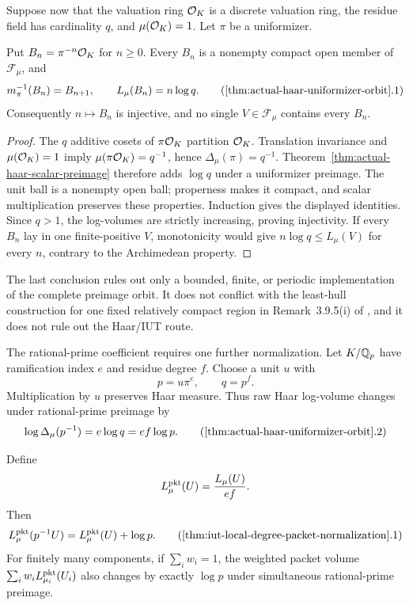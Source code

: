 Suppose now that the valuation ring $\mathcal O_K$ is a discrete valuation ring,
the residue field has cardinality $q$, and $\mu(\mathcal O_K)=1$.  Let $\pi$ be a
uniformizer.

\begin{theorem}
\label{thm:actual-haar-uniformizer-orbit}
Put $B_n=\pi^{-n}\mathcal O_K$ for $n\ge0$.  Every $B_n$ is a nonempty compact
open member of $\mathcal F_\mu$, and
\[
 m_\pi^{-1}(B_n)=B_{n+1},
 \qquad L_\mu(B_n)=n\log q.                 \tag{\ref{thm:actual-haar-uniformizer-orbit}.1}
\]
Consequently $n\mapsto B_n$ is injective, and no single
$V\in\mathcal F_\mu$ contains every $B_n$.
\end{theorem}

\begin{proof}
The $q$ additive cosets of $\pi\mathcal O_K$ partition $\mathcal O_K$.  Translation
invariance and $\mu(\mathcal O_K)=1$ imply
$\mu(\pi\mathcal O_K)=q^{-1}$, hence
$\Delta_\mu(\pi)=q^{-1}$.  Theorem~\ref{thm:actual-haar-scalar-preimage}
therefore adds $\log q$ under a uniformizer preimage.  The unit ball is a
nonempty open ball; properness makes it compact, and scalar multiplication
preserves these properties.  Induction gives the displayed identities.
Since $q>1$, the log-volumes are strictly increasing, proving injectivity.
If every $B_n$ lay in one finite-positive $V$, monotonicity would give
$n\log q\le L_\mu(V)$ for every $n$, contrary to the Archimedean property.
\end{proof}

The last conclusion rules out only a bounded, finite, or periodic
implementation of the complete preimage orbit.  It does not conflict with
the least-hull construction for one fixed relatively compact region in
Remark~3.9.5(i) of \cite{IUT3}, and it does not rule out the Haar/IUT route.

The rational-prime coefficient requires one further normalization.  Let
$K/\mathbb Q_p$ have ramification index $e$ and residue degree $f$.  Choose a unit
$u$ with
\[
                  p=u\pi^e,\qquad q=p^f.
\]
Multiplication by $u$ preserves Haar measure.  Thus raw Haar log-volume
changes under rational-prime preimage by
\[
 \log\Delta_\mu(p^{-1})=e\log q=ef\log p.   \tag{\ref{thm:actual-haar-uniformizer-orbit}.2}
\]

\begin{theorem}
\label{thm:iut-local-degree-packet-normalization}
Define
\[
                  L^{\rm pkt}_\mu(U)=\frac{L_\mu(U)}{ef}.
\]
Then
\[
 L^{\rm pkt}_\mu(p^{-1}U)=L^{\rm pkt}_\mu(U)+\log p.
 \tag{\ref{thm:iut-local-degree-packet-normalization}.1}
\]
For finitely many components, if $\sum_iw_i=1$, the weighted packet volume
$\sum_iw_iL^{\rm pkt}_{\mu_i}(U_i)$ also changes by exactly $\log p$ under
simultaneous rational-prime preimage.
\end{theorem}

